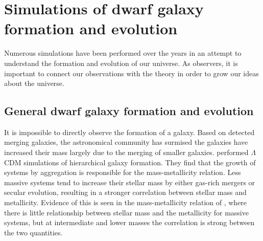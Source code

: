 \chapter[Simulations]{Simulations of dwarf galaxy formation and evolution}


Numerous simulations have been performed over the years in an attempt to 
understand the formation and evolution of our universe.  As observers, it is 
important to connect our observations with the theory in order to grow our ideas 
about the universe.


\section{General dwarf galaxy formation and evolution}

It is impossible to directly observe the formation of a galaxy.  Based on 
detected merging galaxies, the astronomical community has surmised the galaxies 
have increased their mass largely due to the merging of smaller galaxies.  
\cite{deRossi07} performed $\Lambda$CDM simulations of hierarchical galaxy 
formation.  They find that the growth of systems by aggregation is responsible 
for the mass-metallicity relation.  Less massive systems tend to increase their 
stellar mass by either gas-rich mergers or secular evolution, resulting in a 
stronger correlation between stellar mass and metallicity.  Evidence of this is 
seen in the mass-metallicity relation of \cite{Tremonti04}, where there is 
little relationship between stellar mass and the metallicity for massive 
systems, but at intermediate and lower masses the correlation is strong between 
the two quantities.

